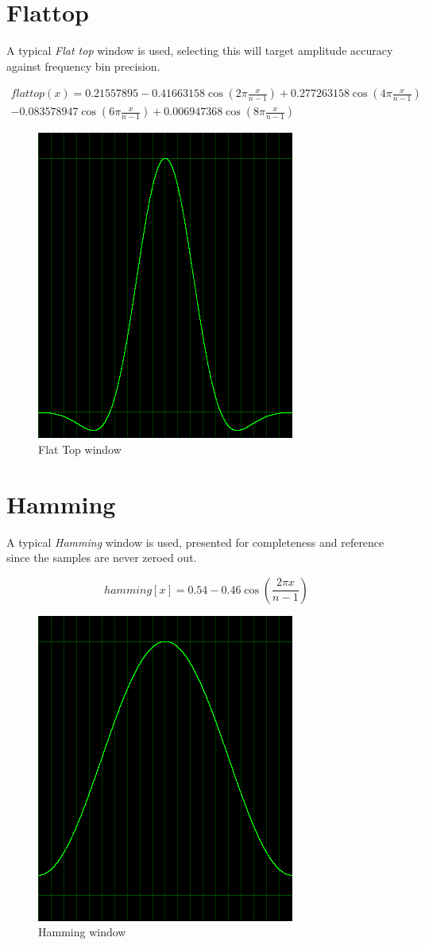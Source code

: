 \documentclass[10pt,a4paper]{report}
\begin{document}
\begin{appendices}
\section{Flattop}
A typical \textit{Flat top} window is used, selecting this will target amplitude accuracy against frequency bin precision.

\begin{align*}
flattop(x)=0.21557895 - 0.41663158\cos(2\pi\frac{x}{n-1})+ 0.277263158\cos(4\pi\frac{x}{n-1})\\
- 0.083578947\cos(6\pi\frac{x}{n-1}) + 0.006947368\cos(8\pi\frac{x}{n-1})
\end{align*}

\begin{figure}[H]
	\centering
	\includegraphics[width=0.4\linewidth]{images/windows/window-flattop.png}
	\caption[Flat Top window]{Flat Top window}
	\label{fig:window-flattop}
\end{figure}

\section{Hamming}
A typical \textit{Hamming} window is used, presented for completeness and reference since the samples are never zeroed out.

\begin{equation}
hamming[x] = 0.54 - 0.46\cos(\frac{2\pi x}{n-1})
\end{equation}

\begin{figure}[H]
	\centering
	\includegraphics[width=0.4\linewidth]{images/windows/window-hamming.png}
	\caption[Hamming window]{Hamming window}
	\label{fig:window-hamming}
\end{figure}


\end{appendices}
\end{document}
